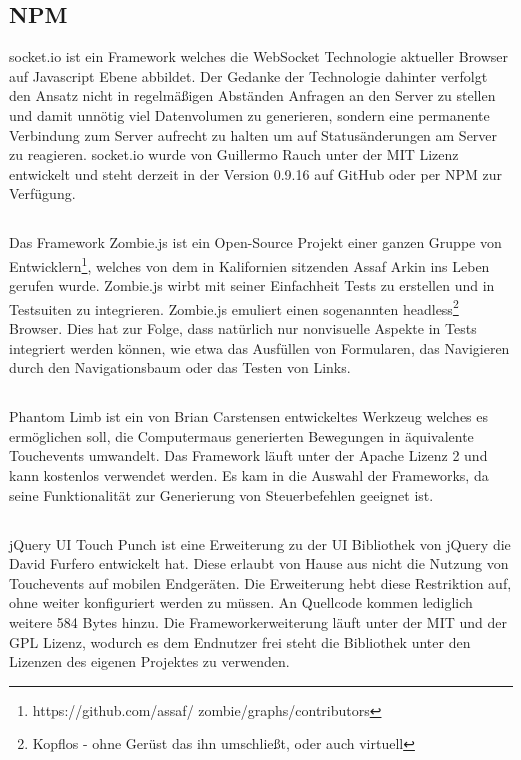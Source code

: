 	\subsection{NPM }
	socket.io ist ein Framework welches die WebSocket Technologie aktueller Browser auf Javascript Ebene abbildet. Der Gedanke der Technologie dahinter verfolgt den Ansatz nicht in regelmäßigen Abständen Anfragen an den Server zu stellen und damit unnötig viel Datenvolumen zu generieren, sondern eine permanente Verbindung zum Server aufrecht zu halten um auf Statusänderungen am Server zu reagieren. socket.io wurde von Guillermo Rauch unter der MIT Lizenz entwickelt und steht derzeit in der Version 0.9.16 auf GitHub oder per NPM zur Verfügung.
	
	\subsection{}
	Das Framework Zombie.js ist ein Open-Source Projekt einer ganzen Gruppe von Entwicklern\footnote{https://github.com/assaf/	zombie/graphs/contributors}, welches von dem in Kalifornien sitzenden Assaf Arkin ins Leben gerufen wurde. Zombie.js wirbt mit 	seiner Einfachheit Tests zu erstellen und in Testsuiten zu integrieren. Zombie.js emuliert einen sogenannten headless\footnote{Kopflos - ohne Gerüst das ihn umschließt, oder auch virtuell} Browser. Dies hat zur Folge, dass natürlich nur nonvisuelle Aspekte in Tests integriert werden können, wie etwa das Ausfüllen von Formularen, das Navigieren durch den Navigationsbaum oder das Testen von Links.

	\subsection{}
	Phantom Limb ist ein von Brian Carstensen entwickeltes Werkzeug welches es ermöglichen soll, die Computermaus generierten Bewegungen in äquivalente \mbox{Touchevents} umwandelt. Das Framework läuft unter der Apache Lizenz 2 und kann kostenlos 	verwendet werden. Es kam in die Auswahl der Frameworks, da seine Funktionalität zur Generierung von Steuerbefehlen geeignet ist.
	
	\subsection{}
	jQuery UI Touch Punch ist eine Erweiterung zu der UI Bibliothek von jQuery die David Furfero entwickelt hat. Diese erlaubt von 	Hause aus nicht die Nutzung von Touchevents auf mobilen Endgeräten. Die Erweiterung hebt diese Restriktion auf, ohne weiter konfiguriert werden zu müssen. An Quellcode kommen lediglich weitere 584 Bytes hinzu. Die Frameworkerweiterung läuft unter der MIT und der GPL Lizenz, wodurch es dem Endnutzer frei steht die Bibliothek unter den Lizenzen des eigenen Projektes zu verwenden.
	
